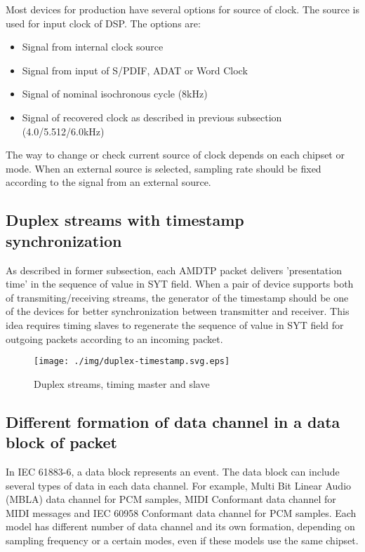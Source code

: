 \documentclass[onecolumn]{article}
\begin{document}
Most devices for production have several options for source of clock. The source is used for input clock of DSP. The options are:
\begin{itemize}
	\item Signal from internal clock source
	\item Signal from input of S/PDIF, ADAT or Word Clock
	\item Signal of nominal isochronous cycle (8kHz)
	\item Signal of recovered clock as described in previous subsection (4.0/5.512/6.0kHz)
\end{itemize}

The way to change or check current source of clock depends on each chipset or mode. When an external source is selected, sampling rate should be fixed according to the signal from an external source.

\subsection{Duplex streams with timestamp synchronization}
\label{sec:duplex-streams}

As described in former subsection, each AMDTP packet delivers 'presentation time' in the sequence of value in SYT field. When a pair of device supports both of transmiting/receiving streams, the generator of the timestamp should be one of the devices for better synchronization between transmitter and receiver. This idea requires timing slaves to regenerate the sequence of value in SYT field for outgoing packets according to an incoming packet.

\begin{figure}[H]
	\centering
	\texttt{[image: ./img/duplex-timestamp.svg.eps]}
	\caption{{Duplex streams, timing master and slave}}
	\label{duplex-timestamp}
\end{figure}


\subsection{Different formation of data channel in a data block of packet}
\label{sec:formation-data-block}

In IEC 61883-6\cite{iec61883-6-1, iec61883-6-2}, a data block represents an event. The data block can include several types of data in each data channel. For example, Multi Bit Linear Audio (MBLA) data channel for PCM samples, MIDI Conformant data channel for MIDI messages and IEC 60958 Conformant data channel for PCM samples. Each model has different number of data channel and its own formation, depending on sampling frequency or a certain modes, even if these models use the same chipset.
\end{document}
